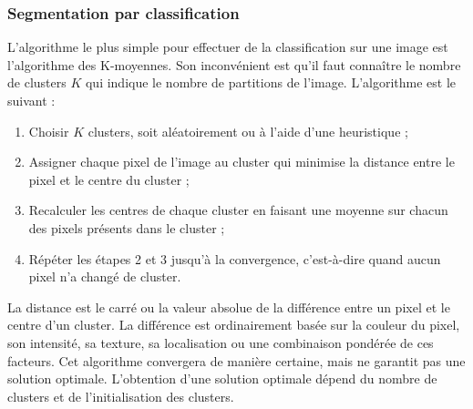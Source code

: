 	\subsubsection{Segmentation par classification}
		\label{subsubsec:segmentationClassification}
		L'algorithme le plus simple pour effectuer de la classification sur une image est l'algorithme des K-moyennes. Son inconvénient est qu'il faut connaître le nombre de clusters $K$ qui indique le nombre de partitions de l'image. L'algorithme est le suivant :
		\vspace{10px}
		\begin{enumerate}
			\item Choisir $K$ clusters, soit aléatoirement ou à l'aide d'une heuristique ;
			\item Assigner chaque pixel de l'image au cluster qui minimise la distance entre le pixel et le centre du cluster ;
			\item Recalculer les centres de chaque cluster en faisant une moyenne sur chacun des pixels présents dans le cluster ;
			\item Répéter les étapes 2 et 3 jusqu'à la convergence, c'est-à-dire quand aucun pixel n'a changé de cluster.
		\end{enumerate}
		\vspace{20px}
		La distance est le carré ou la valeur absolue de la différence entre un pixel et le centre d'un cluster. La différence est ordinairement basée sur la couleur du pixel, son intensité, sa texture, sa localisation ou une combinaison pondérée de ces facteurs. Cet algorithme convergera de manière certaine, mais ne garantit pas une solution optimale. L'obtention d'une solution optimale dépend du nombre de clusters et de l'initialisation des clusters.